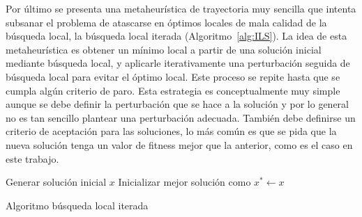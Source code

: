 \smallskip
Por último se presenta una metaheurística de trayectoria muy sencilla que intenta subsanar el problema de atascarse en óptimos locales de mala calidad de la búsqueda local,
la búsqueda local iterada (Algoritmo~\ref{alg:ILS}).
%
La idea de esta metaheurística es obtener un mínimo local a partir de una solución inicial mediante búsqueda local, y aplicarle iterativamente 
una perturbación seguida de búsqueda local para evitar el óptimo local.
%
Este proceso se repite hasta que se cumpla algún criterio de paro. 
%
Esta estrategia es conceptualmente muy simple aunque se debe definir la perturbación que se hace a la solución y por lo general no es tan sencillo plantear una perturbación adecuada. También debe definirse un criterio de aceptación para las soluciones, lo más común es que se pida que la nueva solución tenga un valor de fitness mejor que la anterior, como es el caso en este trabajo.\\

\begin{algorithm}[H]
 Generar solución inicial $x$\;
 Inicializar mejor solución como $x^*\leftarrow x$\;
    \label{alg:ILS}
    \caption{Algoritmo búsqueda local iterada}
\end{algorithm}
